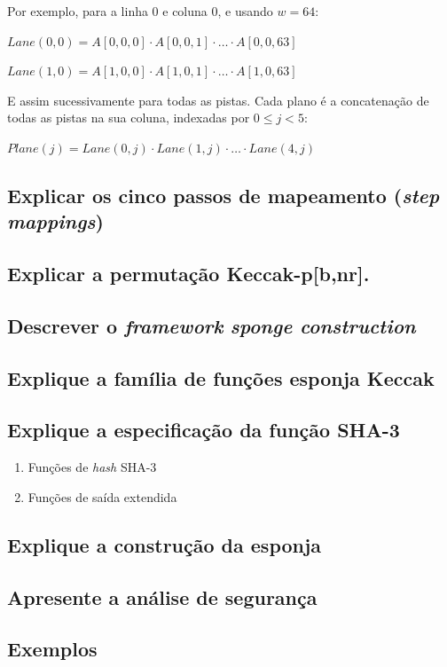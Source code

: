 Por exemplo, para a linha 0 e coluna 0, e usando $w = 64$:

$Lane(0, 0) = A[0, 0, 0] \cdot A[0, 0, 1] \cdot \ldots \cdot A[0, 0, 63]$

$Lane(1, 0) = A[1, 0, 0] \cdot A[1, 0, 1] \cdot \ldots \cdot A[1, 0, 63]$

E assim sucessivamente para todas as pistas. Cada plano é a concatenação de
todas as pistas na sua coluna, indexadas por $0 \leq j < 5$:

$Plane(j) = Lane(0, j) \cdot Lane(1, j) \cdot \ldots \cdot Lane(4, j)$

\subsection{Explicar os cinco passos de mapeamento (\textit{step mappings})}

\subsection{Explicar a permutação Keccak-p[b,nr].}

\subsection{Descrever o \textit{framework} \textit{sponge construction}}

\subsection{Explique a família de funções esponja Keccak}

\subsection{Explique a especificação da função SHA-3}

\begin{enumerate}[label=\roman*.]
    \item Funções de \textit{hash} SHA-3
    \item Funções de saída extendida
\end{enumerate}

\subsection{Explique a construção da esponja}

\subsection{Apresente a análise de segurança}

\subsection{Exemplos}

\let\thesubsection\oldsubsection%
